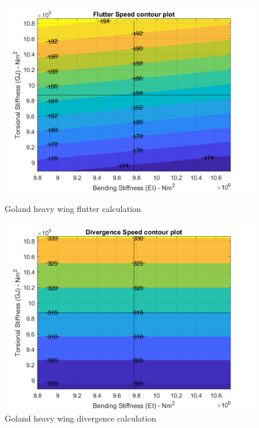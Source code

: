 \documentclass[11pt]{article}
\begin{document}
\begin{figure}[H]
    \begin{minipage}{.5\textwidth}
    \centering
    \includegraphics[width = \textwidth]{figures/Goland_flutter.png}
    \caption{Goland heavy wing flutter calculation}
    \label{fig:Goland-flutter}
    \end{minipage}%
    \begin{minipage}{.5\textwidth}
    \centering
    \includegraphics[width = \textwidth]{figures/Goland_divergence.png}
    \caption{Goland heavy wing divergence calculation}
    \label{fig:Goland-div}
    \end{minipage}
\end{figure}
\end{document}
